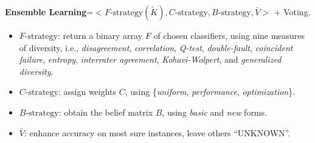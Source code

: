 {\bf Ensemble Learning}=$<F\text{-strategy}(\tilde{K}), C\text{-strategy}, B\text{-strategy}, \bar{V}>$ + Voting.


\begin{itemize}[noitemsep,topsep=1pt]
  \itemsep0.35em 
  \item $F\text{-strategy}$: return a binary array $F$ of chosen classifiers,  using nine measures of diversity, i.e., \emph{disagreement}, \emph{correlation}, \emph{Q-test}, \emph{double-fault}, \emph{coincident failure}, \emph{entropy}, \emph{interrater agreement}, \emph{Kohavi-Wolpert}, and \emph{generalized diversity}. 
  \item $C\text{-strategy}$: assign weights $C$, using \{\emph{uniform}, \emph{performance}, \emph{optimization}\}.
  \item $B\text{-strategy}$: obtain the belief matrix $B$, using \emph{basic} and \emph{new} forms.
  \item $\bar{V}$: enhance accuracy on most sure instances, leave others ``UNKNOWN''.
\end{itemize}


